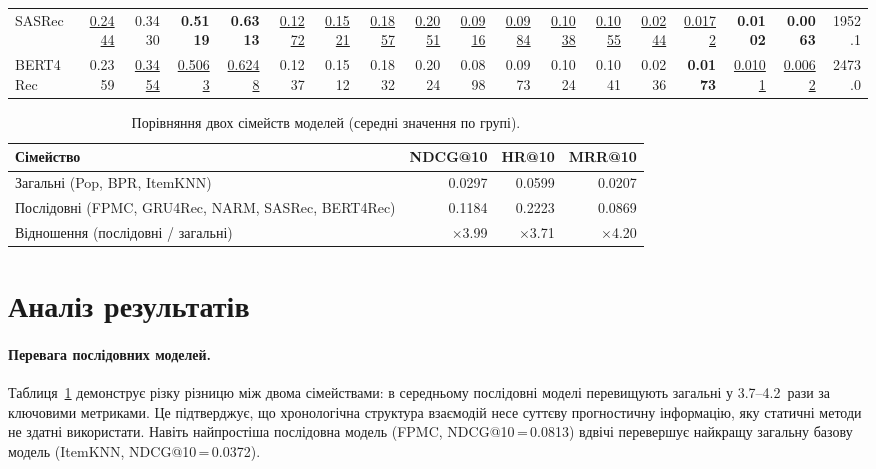 \documentclass[12pt,a4paper]{article}
\newcommand{\best}[1]{\textbf{#1}}
\newcommand{\second}[1]{\underline{#1}}
\begin{document}
\begin{table}
\begin{tabular}{l|rrrr|rrrr|rrrr|rrrr|r}
SASRec
  & \second{0.2444} & 0.3430 & \best{0.5119} & \best{0.6313}
  & \second{0.1272} & \second{0.1521} & \second{0.1857} & \second{0.2051}
  & \second{0.0916} & \second{0.0984} & \second{0.1038} & \second{0.1055}
  & \second{0.0244} & \second{0.0172} & \best{0.0102} & \best{0.0063}
  & 1952.1 \\
BERT4Rec
  & 0.2359 & \second{0.3454} & \second{0.5063} & \second{0.6248}
  & 0.1237 & 0.1512 & 0.1832 & 0.2024
  & 0.0898 & 0.0973 & 0.1024 & 0.1041
  & 0.0236 & \best{0.0173} & \second{0.0101} & \second{0.0062}
  & 2473.0 \\
\bottomrule
\end{tabular}
\end{table}

\begin{table}[h!]
\centering
\caption{Порівняння двох сімейств моделей (середні значення по групі).}
\label{tab:family}
\begin{tabular}{lrrr}
\toprule
Сімейство & NDCG@10 & HR@10 & MRR@10 \\
\midrule
Загальні (Pop, BPR, ItemKNN) & 0.0297 & 0.0599 & 0.0207 \\
Послідовні (FPMC, GRU4Rec, NARM, SASRec, BERT4Rec) & 0.1184 & 0.2223 & 0.0869 \\
\midrule
Відношення (послідовні / загальні) & $\times$3.99 & $\times$3.71 & $\times$4.20 \\
\bottomrule
\end{tabular}
\end{table}

\section{Аналіз результатів}

\paragraph{Перевага послідовних моделей.}
Таблиця~\ref{tab:family} демонструє різку різницю між двома сімействами: в
середньому послідовні моделі перевищують загальні у 3.7--4.2~рази за
ключовими метриками.
Це підтверджує, що хронологічна структура взаємодій несе суттєву
прогностичну інформацію, яку статичні методи не здатні використати.
Навіть найпростіша послідовна модель (FPMC, NDCG@10\,=\,0.0813) вдвічі
перевершує найкращу загальну базову модель (ItemKNN, NDCG@10\,=\,0.0372).
\end{document}
